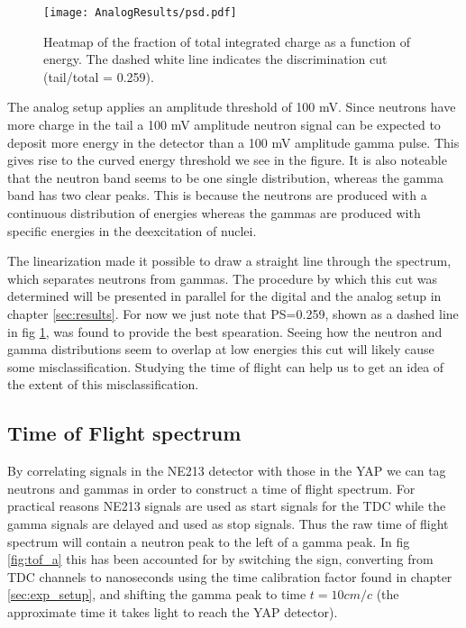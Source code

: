 \documentclass[main.tex]{subfiles}
\begin{document}
\begin{figure}[ht]
    \centering
        \texttt{[image: AnalogResults/psd.pdf]}
        \caption{Heatmap of the fraction of total integrated charge as a function of energy. The dashed white line indicates the discrimination cut (tail/total = 0.259).}
        \label{fig:psd_a}
\end{figure}
The analog setup applies an amplitude threshold of 100 mV. Since neutrons have more charge in the tail a 100 mV amplitude neutron signal can be expected to deposit more energy in the detector than a 100 mV amplitude gamma pulse. This gives rise to the curved energy threshold we see in the figure. It is also noteable that the neutron band seems to be one single distribution, whereas the gamma band has two clear peaks. This is because the neutrons are produced with a continuous distribution of energies whereas the gammas are produced with specific energies in the deexcitation of nuclei.

The linearization made it possible to draw a straight line through the spectrum, which separates neutrons from gammas. The procedure by which this cut was determined will be presented in parallel for the digital and the analog setup in chapter \ref{sec:results}. For now we just note that PS=0.259, shown as a dashed line in fig \ref{fig:psd_a}, was found to provide the best spearation. Seeing how the neutron and gamma distributions seem to overlap at low energies this cut will likely cause some misclassification. Studying the time of flight can help us to get an idea of the extent of this misclassification.


\subsection{Time of Flight spectrum}
By correlating signals in the NE213 detector with those in the YAP we can tag neutrons and gammas in order to construct a time of flight spectrum. For practical reasons NE213 signals are used as start signals for the TDC while the gamma signals are delayed and used as stop signals. Thus the raw time of flight spectrum will contain a neutron peak to the left of a gamma peak. In fig \ref{fig:tof_a} this has been accounted for by switching the sign, converting from TDC channels to nanoseconds using the time calibration factor found in chapter \ref{sec:exp_setup}, and shifting the gamma peak to time $t=10cm/c$ (the approximate time it takes light to reach the YAP detector). 
\end{document}
